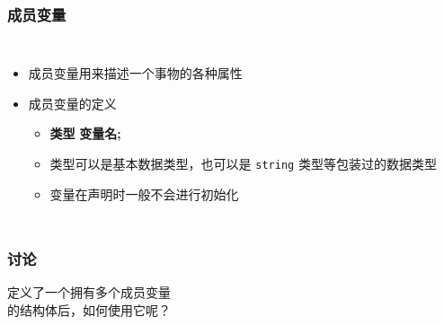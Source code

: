 \begin{frame}[fragile]
    \frametitle{成员变量}
    
    \begin{columns}
        \begin{itemize}
            \item<1-> 成员变量用来描述一个事物的各种属性
            \item<2-> 成员变量的定义
            \begin{itemize}
                \item<3-> \textbf{类型} \textbf{变量名;}
                \item<4-> 类型可以是基本数据类型，也可以是 \lstinline|string| 类型等包装过的数据类型
                \item<5-> 变量在声明时一般不会进行初始化
            \end{itemize}
        \end{itemize}
    
    \end{columns}

\end{frame}

\begin{frame}[fragile]
    \frametitle{讨论}

    \begin{block}{}
        \vspace{.5cm}
        \begin{center}
            {\Large 定义了一个拥有多个成员变量\\的结构体后，如何使用它呢？}
        \end{center}
        \vspace{.5cm}
    \end{block}
\end{frame}


